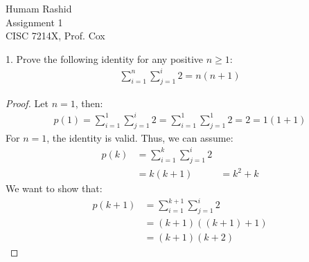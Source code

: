 \documentclass{scrartcl}
\begin{document}
\begin{flushleft}

    Humam Rashid\\
    Assignment 1\\
    CISC 7214X, Prof. Cox\\
    \bigskip
    
    1. Prove the following identity for any positive $n \geq 1$:
    \begin{align*}
        \sum_{i=1}^{n}\sum_{j=1}^{i} 2 = n (n + 1)
    \end{align*}

    \begin{proof}
        Let $n = 1$, then:
        \begin{align}
            p(1) = \sum_{i=1}^{1}\sum_{j=1}^{i} 2 = \sum_{i=1}^{1}\sum_{j=1}^{1} 2 = 2 = 1 (1 + 1)
        \end{align}
        For $n = 1$, the identity is valid. Thus, we can assume:
        \begin{align}
            p(k) &= \sum_{i=1}^{k}\sum_{j=1}^{i} 2 \\
                 &= k (k + 1)
                 &= k^2 + k
        \end{align}
        We want to show that:
        \begin{align}
            p(k + 1) &= \sum_{i=1}^{k + 1}\sum_{j=1}^{i} 2 \\
                     &= (k + 1) ((k + 1) + 1) \\
                     &= (k + 1) (k + 2)
        \end{align}
    \end{proof}

\end{flushleft}
\end{document}

